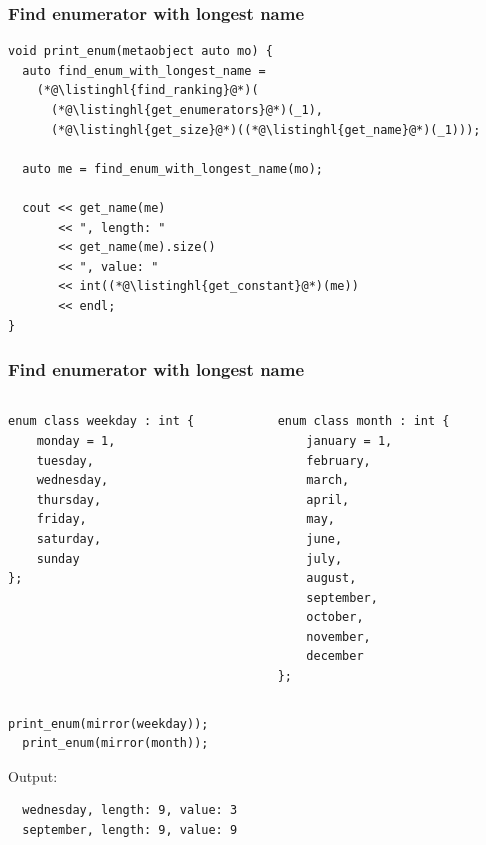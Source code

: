 \documentclass[compress,table,xcolor=table]{beamer}
\begin{document}
\begin{frame}[fragile]
  \frametitle{Find enumerator with longest name}
  \begin{lstlisting}[language=c++2x,basicstyle=\footnotesize\ttfamily]
void print_enum(metaobject auto mo) {
  auto find_enum_with_longest_name =
    (*@\listinghl{find_ranking}@*)(
      (*@\listinghl{get_enumerators}@*)(_1),
      (*@\listinghl{get_size}@*)((*@\listinghl{get_name}@*)(_1)));

  auto me = find_enum_with_longest_name(mo);

  cout << get_name(me)
       << ", length: "
       << get_name(me).size()
       << ", value: "
       << int((*@\listinghl{get_constant}@*)(me))
       << endl;
}
  \end{lstlisting}
\end{frame}
\begin{frame}[fragile]
  \frametitle{Find enumerator with longest name}
  \begin{columns}
    \begin{column}{.45\textwidth}
      \begin{lstlisting}[language=c++2x,basicstyle=\scriptsize\ttfamily]
enum class weekday : int {
    monday = 1,
    tuesday,
    wednesday,
    thursday,
    friday,
    saturday,
    sunday
};
      \end{lstlisting}
    \end{column}
    \begin{column}{.45\textwidth}
      \begin{lstlisting}[language=c++2x,basicstyle=\tiny\ttfamily]
enum class month : int {
    january = 1,
    february,
    march,
    april,
    may,
    june,
    july,
    august,
    september,
    october,
    november,
    december
};
      \end{lstlisting}
    \end{column}
  \end{columns}
  \begin{lstlisting}[language=c++2x]
  print_enum(mirror(weekday));
  print_enum(mirror(month));
  \end{lstlisting}
  Output:
  \begin{verbatim}
  wednesday, length: 9, value: 3
  september, length: 9, value: 9
  \end{verbatim}
\end{frame}
\end{document}
